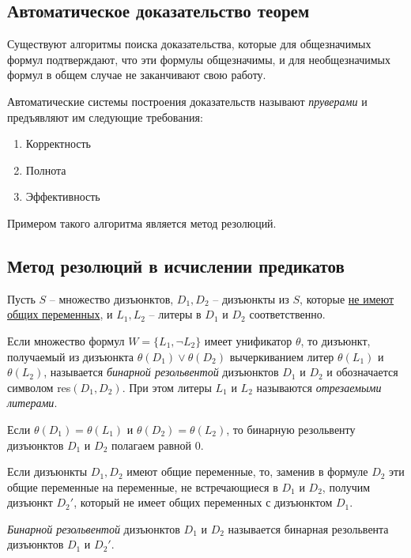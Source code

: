 \subsection*{Автоматическое доказательство теорем}

Существуют алгоритмы поиска доказательства, 
которые для общезначимых формул 
подтверждают, что эти формулы общезначимы, и 
для необщезначимых формул в общем случае не 
заканчивают свою работу.

Автоматические системы построения 
доказательств называют \textit{пруверами} и предъявляют 
им следующие требования:
\begin{enumerate}
    \item Корректность
    \item Полнота
    \item Эффективность
\end{enumerate}

Примером такого алгоритма является метод резолюций.

\subsection*{Метод резолюций в исчислении предикатов}

Пусть $S$ -- множество дизъюнктов, $D_1,D_2$ -- дизъюнкты из $S$, которые \underline{не имеют общих переменных}, и $L_1,L_2$ -- литеры в $D_1$ и $D_2$ соответственно.

\begin{definition}
    Если множество формул $W=\{L_1,\lnot L_2\}$ имеет унификатор $\theta$, то дизъюнкт, получаемый из дизъюнкта $\theta(D_1)\lor\theta(D_2)$ вычеркиванием литер $\theta(L_1)$ и $\theta(L_2)$, называется \textit{бинарной резольвентой} дизъюнктов $D_1$ и $D_2$ и обозначается символом res$(D_1,D_2)$. При этом литеры $L_1$ и $L_2$ называются \textit{отрезаемыми литерами}.
\end{definition}

Если $\theta(D_1)=\theta(L_1)$ и $\theta(D_2)=\theta(L_2)$, то бинарную резольвенту дизъюнктов $D_1$ и $D_2$ полагаем равной 0.

Если дизъюнкты $D_1,D_2$ имеют общие переменные, то, заменив в формуле $D_2$ эти общие переменные на переменные, не встречающиеся в $D_1$ и $D_2$, получим дизъюнкт $D_2'$, который не имеет общих переменных с дизъюнктом $D_1$.
\begin{definition}
    \textit{Бинарной резольвентой} дизъюнктов $D_1$ и $D_2$ называется бинарная резольвента дизъюнктов $D_1$ и $D_2'$.
\end{definition}

